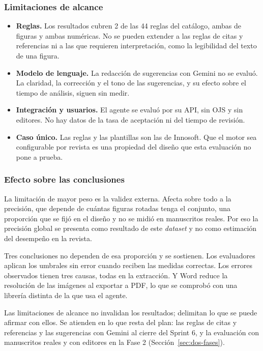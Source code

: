 \subsubsection*{Limitaciones de alcance}

\begin{itemize}
  \item \textbf{Reglas.} Los resultados cubren 2 de las 44 reglas del catálogo, ambas de figuras y ambas numéricas. No se pueden extender a las reglas de citas y referencias ni a las que requieren interpretación, como la legibilidad del texto de una figura.
  \item \textbf{Modelo de lenguaje.} La redacción de sugerencias con Gemini no se evaluó. La claridad, la corrección y el tono de las sugerencias, y su efecto sobre el tiempo de análisis, siguen sin medir.
  \item \textbf{Integración y usuarios.} El agente se evaluó por su API, sin OJS y sin editores. No hay datos de la tasa de aceptación ni del tiempo de revisión.
  \item \textbf{Caso único.} Las reglas y las plantillas son las de Innosoft. Que el motor sea configurable por revista es una propiedad del diseño que esta evaluación no pone a prueba.
\end{itemize}

\subsubsection*{Efecto sobre las conclusiones}

La limitación de mayor peso es la validez externa. Afecta sobre todo a la precisión, que depende de cuántas figuras rotadas tenga el conjunto, una proporción que se fijó en el diseño y no se midió en manuscritos reales. Por eso la precisión global se presenta como resultado de este \emph{dataset} y no como estimación del desempeño en la revista.

Tres conclusiones no dependen de esa proporción y se sostienen. Los evaluadores aplican los umbrales sin error cuando reciben las medidas correctas. Los errores observados tienen tres causas, todas en la extracción. Y Word reduce la resolución de las imágenes al exportar a PDF, lo que se comprobó con una librería distinta de la que usa el agente.

Las limitaciones de alcance no invalidan los resultados; delimitan lo que se puede afirmar con ellos. Se atienden en lo que resta del plan: las reglas de citas y referencias y las sugerencias con Gemini al cierre del Sprint 6, y la evaluación con manuscritos reales y con editores en la Fase 2 (Sección~\ref{sec:dos-fases}).
